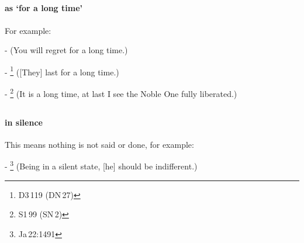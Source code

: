 \subsection*{}\label{nip:ciradm}\label{nip:cirassadm}
\paragraph*{ as `for a long time'} For example:\par
-  (You will regret for a long time.) \par
- \footnote{D3\,119 (DN\,27)} ([They] last for a long time.) \par
- \footnote{S1\,99 (SN\,2)} (It is a long time, at last I see the Noble One fully liberated.) \par

\subsection*{}\label{nip:tudnhii}
\paragraph*{ in silence} This means nothing is not said or done, for example:\par
- \footnote{Ja\,22:1491} (Being in a silent state, [he] should be indifferent.) \par

